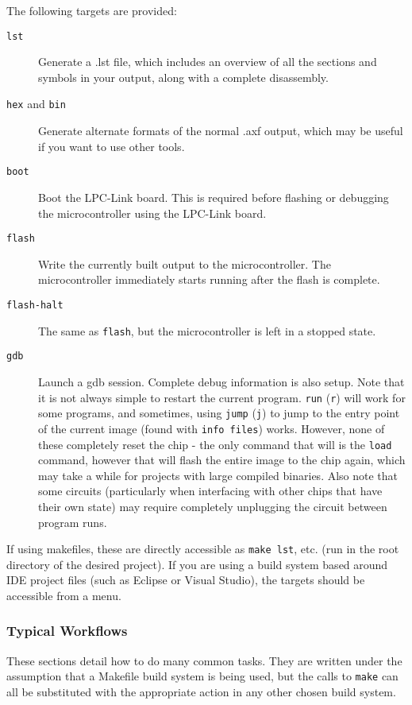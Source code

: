 \documentclass[]{article}
\begin{document}
The following targets are provided:

\begin{description}
\item[\texttt{lst}]
Generate a .lst file, which includes an overview of all the sections and
symbols in your output, along with a complete disassembly.
\item[\texttt{hex} and \texttt{bin}]
Generate alternate formats of the normal .axf output, which may be
useful if you want to use other tools.
\item[\texttt{boot}]
Boot the LPC-Link board. This is required before flashing or debugging
the microcontroller using the LPC-Link board.
\item[\texttt{flash}]
Write the currently built output to the microcontroller. The
microcontroller immediately starts running after the flash is complete.
\item[\texttt{flash-halt}]
The same as \texttt{flash}, but the microcontroller is left in a stopped
state.
\item[\texttt{gdb}]
Launch a gdb session. Complete debug information is also setup. Note
that it is not always simple to restart the current program.
\texttt{run} (\texttt{r}) will work for some programs, and sometimes,
using \texttt{jump} (\texttt{j}) to jump to the entry point of the
current image (found with \texttt{info files}) works. However, none of
these completely reset the chip - the only command that will is the
\texttt{load} command, however that will flash the entire image to the
chip again, which may take a while for projects with large compiled
binaries. Also note that some circuits (particularly when interfacing
with other chips that have their own state) may require completely
unplugging the circuit between program runs.
\end{description}

If using makefiles, these are directly accessible as \texttt{make lst},
etc. (run in the root directory of the desired project). If you are
using a build system based around IDE project files (such as Eclipse or
Visual Studio), the targets should be accessible from a menu.

\subsubsection{Typical Workflows}

These sections detail how to do many common tasks. They are written
under the assumption that a Makefile build system is being used, but the
calls to \texttt{make} can all be substituted with the appropriate
action in any other chosen build system.
\end{document}
